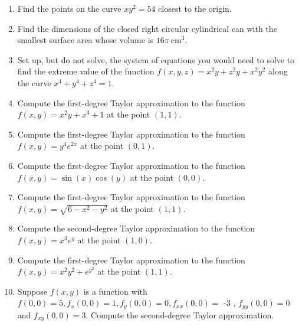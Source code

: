 \documentclass[10pt]{article}
\begin{document}
\begin{enumerate}
	\item Find the points on the curve $x y^{2}=54$ closest to the origin.
  
	 \vspace*{0.46\textheight}
	
	\item Find the dimensions of the closed right circular cylindrical can with the smallest surface area whose volume is $16 \pi \mathrm{~cm}^{3}$.
	
	 \vspace*{0.42\textheight}
	
  \item Set up, but do not solve, the system of equations you would need to solve to find the extreme value of the function $f(x, y, z)=x^{2} y+z^{2} y+x^{2} y^{2}$ along the curve $x^{4}+y^{4}+z^{4}=1$.
	
	 \vspace*{0.45\textheight}
	
  \item Compute the first-degree Taylor approximation to the function $f(x, y)=x^{2} y+x^{3}+1$ at the point $(1,1)$.
	
	 \vspace*{0.15\textheight}
	
  \item Compute the first-degree Taylor approximation to the function $f(x, y)=y^{4} e^{2 x}$ at the point $(0,1)$.
  
	\vspace*{0.2\textheight}
	
	\item Compute the first-degree Taylor approximation to the function $f(x, y)=\sin (x) \cos (y)$ at the point $(0,0)$.
  
	\vspace*{0.2\textheight}
	
	\item Compute the first-degree Taylor approximation to the function $f(x, y)=\sqrt{6-x^{2}-y^{2}}$ at the point $(1,1)$.
		
		\vspace*{0.2\textheight}
	
  \item Compute the second-degree Taylor approximation to the function $f(x, y)=x^{3} e^{y}$ at the point $(1,0)$.
  
		\vspace*{0.25\textheight}
		
	\item Compute the first-degree Taylor approximation to the function $f(x, y)=x^{2} y^{2}+e^{y^{2}}$ at the point $(1,1)$.
  
		\vspace*{0.25\textheight}
	
	\item Suppose $f(x, y)$ is a function with $f(0,0)=5, f_{x}(0,0)=1, f_{y}(0,0)=0, f_{x x}(0,0)=$ -3 , $f_{y y}(0,0)=0$ and $f_{x y}(0,0)=3$. Compute the second-degree Taylor approximation.
\end{enumerate}
\end{document}

